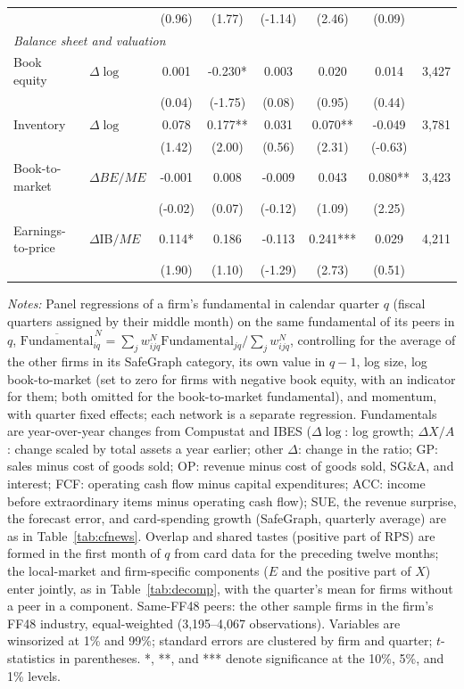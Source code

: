 \begin{table}[!htbp]
\begin{tabular*}{\linewidth}{@{\extracolsep{\fill}}llcccccr}
 &  & (0.96) & (1.77) & (-1.14) & (2.46) & (0.09) &  \\
\multicolumn{8}{l}{\emph{Balance sheet and valuation}} \\
\quad Book equity & $\Delta\log$ & 0.001 & -0.230* & 0.003 & 0.020 & 0.014 & 3,427 \\
 &  & (0.04) & (-1.75) & (0.08) & (0.95) & (0.44) &  \\
\quad Inventory & $\Delta\log$ & 0.078 & 0.177** & 0.031 & 0.070** & -0.049 & 3,781 \\
 &  & (1.42) & (2.00) & (0.56) & (2.31) & (-0.63) &  \\
\quad Book-to-market & $\Delta BE/ME$ & -0.001 & 0.008 & -0.009 & 0.043 & 0.080** & 3,423 \\
 &  & (-0.02) & (0.07) & (-0.12) & (1.09) & (2.25) &  \\
\quad Earnings-to-price & $\Delta$IB$/ME$ & 0.114* & 0.186 & -0.113 & 0.241*** & 0.029 & 4,211 \\
 &  & (1.90) & (1.10) & (-1.29) & (2.73) & (0.51) &  \\
\bottomrule
\end{tabular*}
\par\vspace{4pt}\begin{minipage}{\linewidth}\scriptsize \emph{Notes:} Panel regressions of a firm's fundamental in calendar quarter $q$ (fiscal quarters assigned by their middle month) on the same fundamental of its peers in $q$, $\overline{\mathrm{Fundamental}}^{\,N}_{iq}=\sum_j w^{N}_{ijq}\mathrm{Fundamental}_{jq}/\sum_j w^{N}_{ijq}$, controlling for the average of the other firms in its SafeGraph category, its own value in $q-1$, log size, log book-to-market (set to zero for firms with negative book equity, with an indicator for them; both omitted for the book-to-market fundamental), and momentum, with quarter fixed effects; each network is a separate regression. Fundamentals are year-over-year changes from Compustat and IBES ($\Delta\log$: log growth; $\Delta X/A$: change scaled by total assets a year earlier; other $\Delta$: change in the ratio; GP: sales minus cost of goods sold; OP: revenue minus cost of goods sold, SG\&A, and interest; FCF: operating cash flow minus capital expenditures; ACC: income before extraordinary items minus operating cash flow); SUE, the revenue surprise, the forecast error, and card-spending growth (SafeGraph, quarterly average) are as in Table~\ref{tab:cfnews}. Overlap and shared tastes (positive part of RPS) are formed in the first month of $q$ from card data for the preceding twelve months; the local-market and firm-specific components ($E$ and the positive part of $X$) enter jointly, as in Table~\ref{tab:decomp}, with the quarter's mean for firms without a peer in a component. Same-FF48 peers: the other sample firms in the firm's FF48 industry, equal-weighted (3,195--4,067 observations). Variables are winsorized at 1\% and 99\%; standard errors are clustered by firm and quarter; $t$-statistics in parentheses. *, **, and *** denote significance at the 10\%, 5\%, and 1\% levels.\end{minipage}
\end{table}